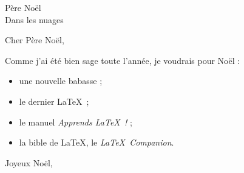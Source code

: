 \documentclass[a4paper,11pt]{letter}
\begin{document}
\begin{letter}{Père Noël \\ Dans les nuages}

\opening{Cher Père Noël,}

Comme j'ai été bien sage toute l'année, je voudrais
pour Noël :

\begin{itemize}

\item une nouvelle babasse ;

\item le dernier \LaTeX\ ;

\item le manuel \textit{Apprends \LaTeX\ !} ;

\item la bible de \LaTeX, le \textit{\LaTeX\ Companion}.

\end{itemize}

\closing{Joyeux Noël,}

\end{letter}
\end{document}
